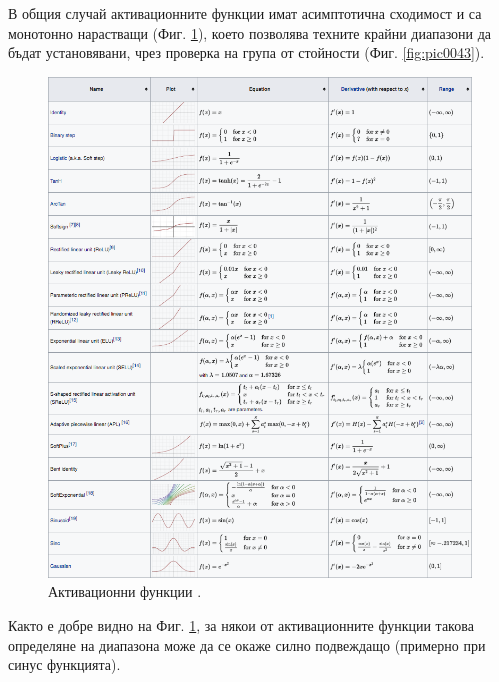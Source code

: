 \documentclass[book,14pt,oneside,openany]{memoir}
\begin{document}
В общия случай активационните функции имат асимптотична сходимост и са монотонно нарастващи (Фиг. \ref{fig:pic0044}), което позволява техните крайни диапазони да бъдат установявани, чрез проверка на група от стойности (Фиг. \ref{fig:pic0043}).

\begin{figure}[h]
  \centering
  \includegraphics[height=0.7\pdfpageheight]{./images/pic0044.png}
  \caption{Активационни функции \cite{afwiki}.}
\label{fig:pic0044}
\end{figure}
\FloatBarrier

Както е добре видно на Фиг. \ref{fig:pic0044}, за някои от активационните функции такова определяне на диапазона може да се окаже силно подвеждащо (примерно при синус функцията). 
\end{document}
